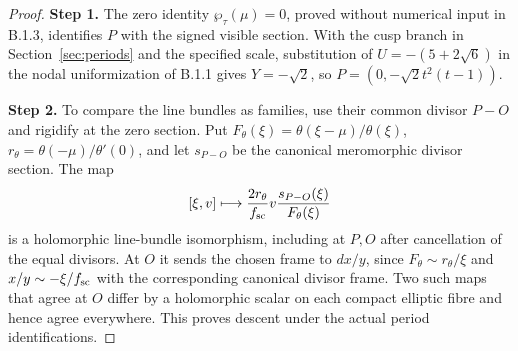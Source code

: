 \documentclass[11pt,a4paper]{article}
\theoremstyle{plain}
\theoremstyle{definition}
\begin{document}
\begin{proof}
\par\smallskip\noindent\textbf{Step 1.} The zero identity $\wp_\tau(\mu)=0$, proved without numerical input in B.1.3, identifies $P$ with the signed visible section. With the cusp branch in Section~\ref{sec:periods} and the specified scale, substitution of $U=-(5+2\sqrt6)$ in the nodal uniformization of B.1.1 gives $Y=-\sqrt2$, so $P=(0,-\sqrt2t^2(t-1))$.

\par\smallskip\noindent\textbf{Step 2.} To compare the line bundles as families, use their common divisor $P-O$ and rigidify at the zero section. Put $F_\theta(\xi)=\theta(\xi-\mu)/\theta(\xi)$, $r_\theta=\theta(-\mu)/\theta'(0)$, and let $s_{P-O}$ be the canonical meromorphic divisor section. The map
\[
 [\xi,v]\longmapsto\frac{2r_\theta}{f_{\rm sc}}
        v\frac{s_{P-O}(\xi)}{F_\theta(\xi)}
\]
is a holomorphic line-bundle isomorphism, including at $P,O$ after cancellation of the equal divisors. At $O$ it sends the chosen frame to $dx/y$, since $F_\theta\sim r_\theta/\xi$ and $x/y\sim-\xi/f_{\rm sc}$ with the corresponding canonical divisor frame. Two such maps that agree at $O$ differ by a holomorphic scalar on each compact elliptic fibre and hence agree everywhere. This proves descent under the actual period identifications.


\end{proof}
\end{document}
